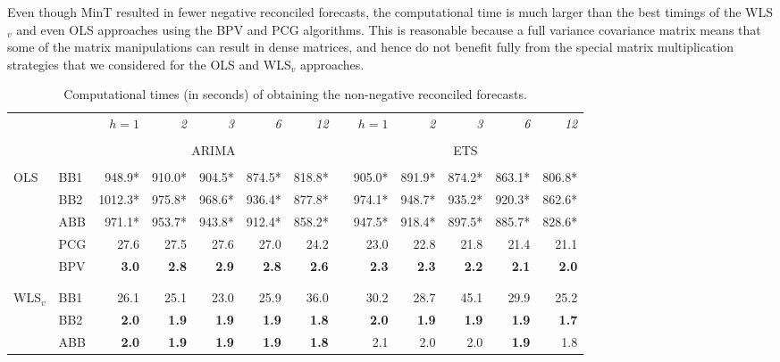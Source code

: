 \documentclass[11pt]{article}
\newcommand{\0}{\phantom{0}}
\begin{document}
Even though MinT resulted in fewer negative reconciled forecasts, the computational time is much larger than the best timings of the WLS$_{v}$ and even OLS approaches using the BPV and PCG algorithms. This is reasonable because a full variance covariance matrix means that some of the matrix manipulations can result in dense matrices, and hence do not benefit fully from the special matrix multiplication strategies that we considered for the OLS and WLS$_{v}$ approaches.

\begin{table}[p]
	\centering
	\fontsize{9}{12}\rm\tabcolsep=0.13cm
	\caption{Computational times (in seconds) of obtaining the non-negative reconciled forecasts.}
	\label{tbl:timingap}
	\begin{threeparttable}
		\begin{tabular}{llrrrrrrrrrrr}
			\toprule
			& & \it{$h=1$} & \it{2} & \it{3} & \it{6} & \it{12} & & \it{$h=1$} & \it{2} & \it{3} & \it{6} & \it{12} \\
			\cline{3-7} \cline{9-13} \\[-0.3cm]
			& & \multicolumn{5}{c}{ARIMA} & & \multicolumn{5}{c}{ETS} \\\cline{3-7} \cline{9-13}\\[-0.3cm]
			OLS & BB1 & 948.9* & 910.0* & 904.5* & 874.5* & 818.8* & & 905.0* & 891.9* & 874.2* & 863.1* & 806.8* \\
			& BB2 & 1012.3* & 975.8* & 968.6* & 936.4* & 877.8* & & 974.1* & 948.7* & 935.2* & 920.3* & 862.6* \\
			& ABB & 971.1* & 953.7* & 943.8* & 912.4* & 858.2* & & 947.5* & 918.4* & 897.5* & 885.7* & 828.6* \\
			& PCG & 27.6 & 27.5 & 27.6 & 27.0 & 24.2 & & 23.0 & 22.8 & 21.8 & 21.4 & 21.1 \\
			& BPV & {\bf 3.0} & {\bf 2.8} & {\bf 2.9} & {\bf 2.8} & {\bf 2.6} & & {\bf 2.3} & {\bf 2.3} & {\bf 2.2} & {\bf 2.1} & {\bf 2.0} \\ \\[-0.3cm]
			\cline{3-7} \cline{9-13} \\[-0.3cm]
			WLS$_{v}$ & BB1 & 26.1 & 25.1 & 23.0 & 25.9 & 36.0 & & 30.2 & 28.7 & 45.1 & 29.9 & 25.2 \\
			& BB2 & {\bf 2.0} & {\bf 1.9} & {\bf 1.9} & {\bf 1.9} & {\bf 1.8} & & {\bf 2.0} & {\bf 1.9} & {\bf 1.9} & {\bf 1.9} & {\bf 1.7} \\
			& ABB & {\bf 2.0} & {\bf 1.9} & {\bf 1.9} & {\bf 1.9} & {\bf 1.8} & & 2.1 & 2.0 & 2.0 & {\bf 1.9} & 1.8 \\

\end{tabular}
\end{threeparttable}
\end{table}
\end{document}
